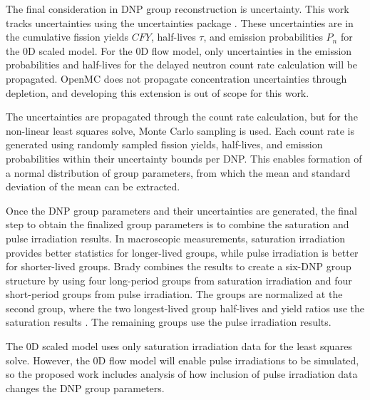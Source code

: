 The final consideration in \gls{DNP} group reconstruction is uncertainty.
This work tracks uncertainties using the uncertainties package \cite{uncertaintiespackage}.
These uncertainties are in the cumulative fission yields $CFY$, half-lives $\tau$, and emission probabilities $P_n$ for the 0D scaled model.
For the 0D flow model, only uncertainties in the emission probabilities and half-lives for the delayed neutron count rate calculation will be propagated.
OpenMC does not propagate concentration uncertainties through depletion, and developing this extension is out of scope for this work.

The uncertainties are propagated through the count rate calculation, but for the non-linear least squares solve, Monte Carlo sampling is used.
Each count rate is generated using randomly sampled fission yields, half-lives, and emission probabilities within their uncertainty bounds per \gls{DNP}.
This enables formation of a normal distribution of group parameters, from which the mean and standard deviation of the mean can be extracted.



Once the \gls{DNP} group parameters and their uncertainties are generated, the final step to obtain the finalized group parameters is to combine the saturation and pulse irradiation results.
In macroscopic measurements, saturation irradiation provides better statistics for longer-lived groups, while pulse irradiation is better for shorter-lived groups.
Brady combines the results to create a six-\gls{DNP} group structure by using four long-period groups from saturation irradiation and four short-period groups from pulse irradiation.
The groups are normalized at the second group, where the two longest-lived group half-lives and yield ratios use the saturation results \cite{brady1988evaluation}.
The remaining groups use the pulse irradiation results.

The 0D scaled model uses only saturation irradiation data for the least squares solve.
However, the 0D flow model will enable pulse irradiations to be simulated, so the proposed work includes analysis of how inclusion of pulse irradiation data changes the \gls{DNP} group parameters.
